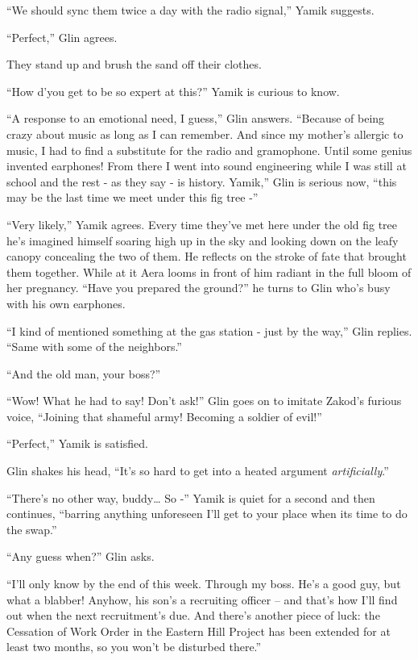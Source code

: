 \documentclass[twoside,11pt]{book}
\begin{document}
``We should sync them twice a day with the radio signal,'' Yamik suggests.

``Perfect,'' Glin agrees.

They stand up and brush the sand off their clothes.

``How d'you get to be so expert at this?'' Yamik is curious to know.

``A response to an emotional need, I guess,'' Glin answers. ``Because of being
crazy about music as long as I can remember. And since my mother's allergic to music, I had to find a substitute for
the radio and gramophone. Until some genius invented earphones! From there I went into sound engineering while I was
still at school and the rest - as they say - is history. Yamik,'' Glin is serious now, ``this
may be the last time we meet under this fig tree -''

``Very likely,'' Yamik agrees. Every time they've met here under the old fig tree he's
imagined himself soaring high up in the sky and looking down on the leafy canopy concealing the two of them. He
reflects on the stroke of fate that brought them together. While at it Aera looms in front of him radiant in the full
bloom of her pregnancy. ``Have you prepared the ground?'' he turns to Glin who's busy with
his own earphones.

``I kind of mentioned something at the gas station - just by the way,'' Glin replies.
``Same with some of the neighbors.''

``And the old man, your boss?''

``Wow! What he had to say! Don't ask!'' Glin goes on to imitate Zakod's furious voice,
``Joining that shameful army! Becoming a soldier of evil!''

``Perfect,'' Yamik is satisfied.

Glin shakes his head, ``It's so hard to get into a heated argument \textit{artificially}.''

``There's no other way, buddy{\dots} So -'' Yamik is quiet for a second and then continues,
``barring anything unforeseen I'll get to your place when its time to do the swap.''

``Any guess when?'' Glin asks.

``I'll only know by the end of this week. Through my boss. He's a good guy, but what a blabber! Anyhow, his
son's a recruiting officer -- and that's how I'll find out when the next recruitment's due. And there's another piece
of luck: the Cessation of Work Order in the Eastern Hill Project has been extended for at least two months, so you
won't be disturbed there.''
\end{document}
